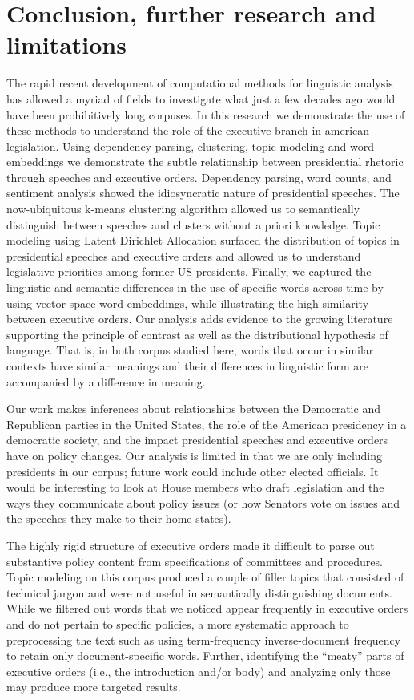 \documentclass{article}
\begin{document}
\section{Conclusion, further research and limitations}{
The rapid recent development of computational methods for linguistic analysis has allowed a myriad of fields to investigate what just a few decades ago would have been prohibitively long corpuses. In this research we demonstrate the use of these methods to understand the role of the executive branch in american legislation. Using dependency parsing, clustering, topic modeling and word embeddings we demonstrate the subtle relationship between presidential rhetoric through speeches and executive orders. Dependency parsing, word counts, and sentiment analysis showed the idiosyncratic nature of presidential speeches. The now-ubiquitous k-means clustering algorithm allowed us to semantically distinguish between speeches and clusters without a priori knowledge. Topic modeling using Latent Dirichlet Allocation surfaced the distribution of topics in presidential speeches and executive orders and allowed us to understand legislative priorities among former US presidents. Finally, we captured the linguistic and semantic differences in the use of specific words across time by using vector space word embeddings, while illustrating the high similarity between executive orders. Our analysis adds evidence to the growing literature supporting the principle of contrast as well as the distributional hypothesis of language. That is, in both corpus studied here, words that occur in similar contexts have similar meanings and their differences in linguistic form are accompanied by a difference in meaning.  

Our work makes inferences about relationships between the Democratic and Republican parties in the United States, the role of the American presidency in a democratic society, and the impact presidential speeches and executive orders have on policy changes. Our analysis is limited in that we are only including presidents in our corpus; future work could include other elected officials. It would be interesting to look at House members who draft legislation and the ways they communicate about policy issues (or how Senators vote on issues and the speeches they make to their home states). 

The highly rigid structure of executive orders made it difficult to parse out substantive policy content from specifications of committees and procedures. Topic modeling on this corpus produced a couple of filler topics that consisted of technical jargon and were not useful in semantically distinguishing documents. While we filtered out words that we noticed appear frequently in executive orders and do not pertain to specific policies, a more systematic approach to preprocessing the text such as using term-frequency inverse-document frequency to retain only document-specific words. Further, identifying the “meaty” parts of executive orders (i.e., the introduction and/or body) and analyzing only those may produce more targeted results. 

}
\end{document}
